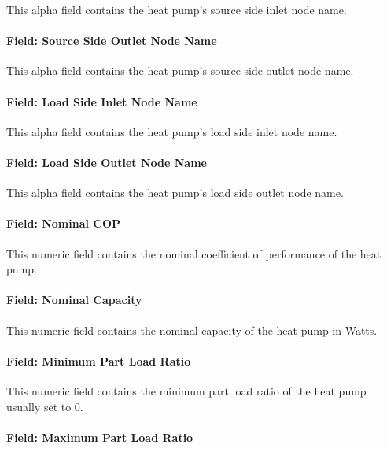 This alpha field contains the heat pump's source side inlet node name.

\paragraph{Field: Source Side Outlet Node Name}\label{field-source-side-outlet-node-name-3}

This alpha field contains the heat pump's source side outlet node name.

\paragraph{Field: Load Side Inlet Node Name}\label{field-load-side-inlet-node-name-3}

This alpha field contains the heat pump's load side inlet node name.

\paragraph{Field: Load Side Outlet Node Name}\label{field-load-side-outlet-node-name-3}

This alpha field contains the heat pump's load side outlet node name.

\paragraph{Field: Nominal COP}\label{field-nominal-cop-5}

This numeric field contains the nominal coefficient of performance of the heat pump.

\paragraph{Field: Nominal Capacity}\label{field-nominal-capacity-9}

This numeric field contains the nominal capacity of the heat pump in Watts.

\paragraph{Field: Minimum Part Load Ratio}\label{field-minimum-part-load-ratio-12}

This numeric field contains the minimum part load ratio of the heat pump usually set to 0.

\paragraph{Field: Maximum Part Load Ratio}\label{field-maximum-part-load-ratio-12}

